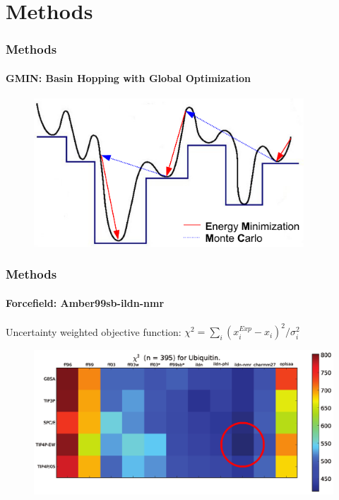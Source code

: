 \documentclass[english]{beamer}
\begin{document}




\section{Methods}

\begin{frame}
    \frametitle{Methods}
    \framesubtitle{GMIN: Basin Hopping with Global Optimization}

    \begin{figure}
        \includegraphics[width=0.9\textwidth]{figures/GMIN/GMIN.pdf}
    \end{figure}        

\end{frame}    


\begin{frame}
    \frametitle{Methods}
    \framesubtitle{Forcefield: Amber99sb-ildn-nmr}

    Uncertainty weighted objective function: $\chi^2 = \sum_i(x_i^{Exp} - x_i)^2 / \sigma_i^2$

    \begin{figure}
        \includegraphics[width=\linewidth]{figures/forcefield_performance.png}
    \end{figure}        

    \tiny

    

\end{frame}   
\end{document}
